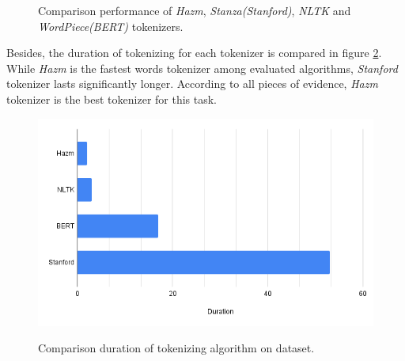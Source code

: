 \begin{figure}%
	\centering
	\qquad
	\qquad
	\caption{Comparison performance of \textit{Hazm}, \textit{Stanza(Stanford)}, \textit{NLTK} and \textit{WordPiece(\ac{BERT})} tokenizers.}%
	\label{fig:tekenres}%
\end{figure}

	Besides, the duration of tokenizing for each tokenizer is compared in figure \ref{fig:tokentime}. While \textit{Hazm} is the fastest words tokenizer among evaluated algorithms, \textit{Stanford} tokenizer lasts significantly longer. According to all pieces of evidence, \textit{Hazm} tokenizer is the best tokenizer for this task.

\begin{figure}%
	\centering
	{\includegraphics[width=12.5cm]{statistics/tokenizer/duration.png} }
	\caption{Comparison duration of tokenizing algorithm on \cite{stance_persian} dataset.}%
	\label{fig:tokentime}%
\end{figure}


